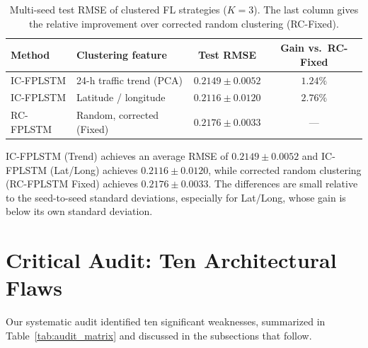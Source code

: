 \documentclass[11pt,a4paper]{article}
\begin{document}
\begin{table}[htbp]
\centering
\caption{Multi-seed test RMSE of clustered FL strategies ($K=3$). The last column gives the relative improvement over corrected random clustering (RC-Fixed).}
\label{tab:clustering_results}
\small
\begin{tabular}{@{}llcc@{}}
\toprule
\textbf{Method} & \textbf{Clustering feature} & \textbf{Test RMSE} & \textbf{Gain vs.\ RC-Fixed} \\
\midrule
IC-FPLSTM  & 24-h traffic trend (PCA) & $0.2149 \pm 0.0052$ & $1.24\%$ \\
IC-FPLSTM  & Latitude / longitude     & $0.2116 \pm 0.0120$ & $2.76\%$ \\
RC-FPLSTM  & Random, corrected (Fixed)& $0.2176 \pm 0.0033$ & --- \\
\bottomrule
\end{tabular}
\end{table}

IC-FPLSTM (Trend) achieves an average RMSE of $0.2149 \pm 0.0052$ and IC-FPLSTM (Lat/Long) achieves $0.2116 \pm 0.0120$, while corrected random clustering (RC-FPLSTM Fixed) achieves $0.2176 \pm 0.0033$. The differences are small relative to the seed-to-seed standard deviations, especially for Lat/Long, whose gain is below its own standard deviation.

\section{Critical Audit: Ten Architectural Flaws}
\label{sec:critique}
Our systematic audit identified ten significant weaknesses, summarized in Table~\ref{tab:audit_matrix} and discussed in the subsections that follow.
\end{document}

